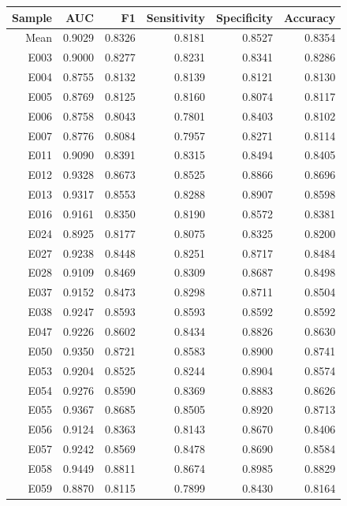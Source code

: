 \begin{table}[ht]
\centering
\begin{tabular}{rrrrrr}
  \hline
Sample & AUC & F1 & Sensitivity & Specificity & Accuracy \\ 
  \hline
Mean & 0.9029 & 0.8326 & 0.8181 & 0.8527 & 0.8354 \\
\hline 
  E003 & 0.9000 & 0.8277 & 0.8231 & 0.8341 & 0.8286 \\ 
  E004 & 0.8755 & 0.8132 & 0.8139 & 0.8121 & 0.8130 \\ 
  E005 & 0.8769 & 0.8125 & 0.8160 & 0.8074 & 0.8117 \\ 
  E006 & 0.8758 & 0.8043 & 0.7801 & 0.8403 & 0.8102 \\ 
  E007 & 0.8776 & 0.8084 & 0.7957 & 0.8271 & 0.8114 \\ 
  E011 & 0.9090 & 0.8391 & 0.8315 & 0.8494 & 0.8405 \\ 
  E012 & 0.9328 & 0.8673 & 0.8525 & 0.8866 & 0.8696 \\ 
  E013 & 0.9317 & 0.8553 & 0.8288 & 0.8907 & 0.8598 \\ 
  E016 & 0.9161 & 0.8350 & 0.8190 & 0.8572 & 0.8381 \\ 
  E024 & 0.8925 & 0.8177 & 0.8075 & 0.8325 & 0.8200 \\ 
  E027 & 0.9238 & 0.8448 & 0.8251 & 0.8717 & 0.8484 \\ 
  E028 & 0.9109 & 0.8469 & 0.8309 & 0.8687 & 0.8498 \\ 
  E037 & 0.9152 & 0.8473 & 0.8298 & 0.8711 & 0.8504 \\ 
  E038 & 0.9247 & 0.8593 & 0.8593 & 0.8592 & 0.8592 \\ 
  E047 & 0.9226 & 0.8602 & 0.8434 & 0.8826 & 0.8630 \\ 
  E050 & 0.9350 & 0.8721 & 0.8583 & 0.8900 & 0.8741 \\ 
  E053 & 0.9204 & 0.8525 & 0.8244 & 0.8904 & 0.8574 \\ 
  E054 & 0.9276 & 0.8590 & 0.8369 & 0.8883 & 0.8626 \\ 
  E055 & 0.9367 & 0.8685 & 0.8505 & 0.8920 & 0.8713 \\ 
  E056 & 0.9124 & 0.8363 & 0.8143 & 0.8670 & 0.8406 \\ 
  E057 & 0.9242 & 0.8569 & 0.8478 & 0.8690 & 0.8584 \\ 
  E058 & 0.9449 & 0.8811 & 0.8674 & 0.8985 & 0.8829 \\ 
  E059 & 0.8870 & 0.8115 & 0.7899 & 0.8430 & 0.8164 \\ 

\end{tabular}
\end{table}
